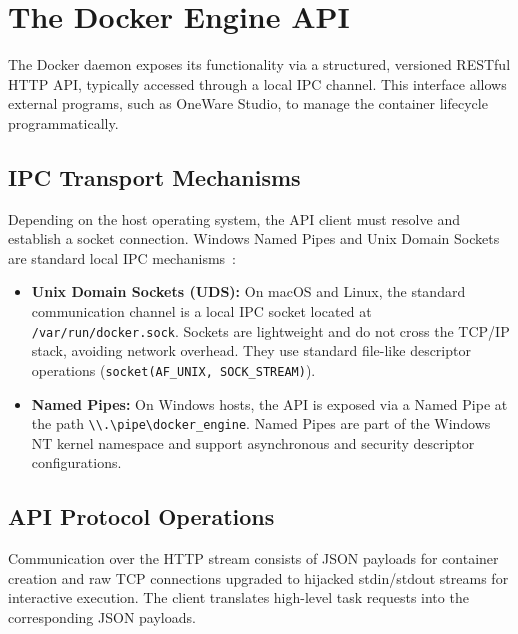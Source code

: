 \clearpage
\section{The Docker Engine API}
The Docker daemon exposes its functionality via a structured, versioned RESTful HTTP API, typically accessed through a local IPC channel. This interface allows external programs, such as OneWare Studio, to manage the container lifecycle programmatically.

\subsection{IPC Transport Mechanisms}
Depending on the host operating system, the API client must resolve and establish a socket connection. Windows Named Pipes and Unix Domain Sockets are standard local IPC mechanisms~\cite{stevens2013advanced}:
\begin{itemize}
    \item \textbf{Unix Domain Sockets (UDS):} On macOS and Linux, the standard communication channel is a local IPC socket located at \texttt{/var/run/docker.sock}. Sockets are lightweight and do not cross the TCP/IP stack, avoiding network overhead. They use standard file-like descriptor operations (\texttt{socket(AF\_UNIX, SOCK\_STREAM)}).
    \item \textbf{Named Pipes:} On Windows hosts, the API is exposed via a Named Pipe at the path \texttt{\textbackslash\textbackslash.\textbackslash pipe\textbackslash docker\_engine}. Named Pipes are part of the Windows NT kernel namespace and support asynchronous  and security descriptor configurations.
\end{itemize}

\clearpage
\subsection{API Protocol Operations}
Communication over the HTTP stream consists of JSON payloads for container creation and raw TCP connections upgraded to hijacked stdin/stdout streams for interactive execution. The client translates high-level task requests into the corresponding JSON payloads.

\clearpage
